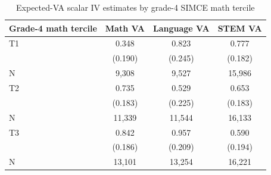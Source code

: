 \begin{table}[!htbp]
\centering
\caption{Expected-VA scalar IV estimates by grade-4 SIMCE math tercile}
\label{tab:scalar_school_value_iv_expected_va_by_simce4_math_tercile}
\begin{tabular}{lccc}
\toprule
Grade-4 math tercile & Math VA & Language VA & STEM VA \\
\midrule
T1 & 0.348 & 0.823 & 0.777 \\
 & (0.190) & (0.245) & (0.182) \\
N & 9,308 & 9,527 & 15,986 \\
T2 & 0.735 & 0.529 & 0.653 \\
 & (0.183) & (0.225) & (0.183) \\
N & 11,339 & 11,544 & 16,133 \\
T3 & 0.842 & 0.957 & 0.590 \\
 & (0.186) & (0.209) & (0.194) \\
N & 13,101 & 13,254 & 16,221 \\
\bottomrule
\end{tabular}
\end{table}
